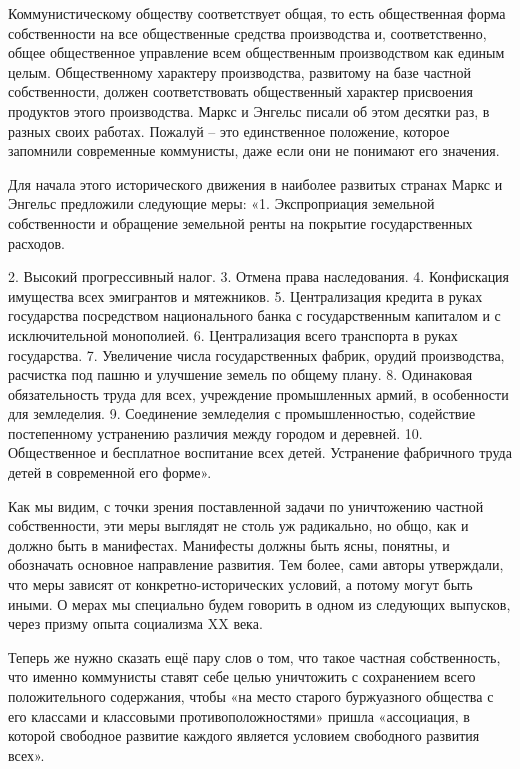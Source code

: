 \documentclass[../main]{subfiles}
\begin{document}
Коммунистическому обществу соответствует общая, то есть общественная форма собственности на все общественные средства производства и, соответственно, общее общественное управление всем общественным производством как единым целым. Общественному характеру производства, развитому на базе частной собственности, должен соответствовать общественный характер присвоения продуктов этого производства. Маркс и Энгельс писали об этом десятки раз, в разных своих работах. Пожалуй – это единственное положение, которое запомнили современные коммунисты, даже если они не понимают его значения.

Для начала этого исторического движения в наиболее развитых странах Маркс и Энгельс предложили следующие меры: «1. Экспроприация земельной собственности и обращение земельной ренты на покрытие государственных расходов.

2. Высокий прогрессивный налог. 3. Отмена права наследования. 4. Конфискация имущества всех эмигрантов и мятежников. 5. Централизация кредита в руках государства посредством национального банка с государственным капиталом и с исключительной монополией. 6. Централизация всего транспорта в руках государства. 7. Увеличение числа государственных фабрик, орудий производства, расчистка под пашню и улучшение земель по общему плану. 8. Одинаковая обязательность труда для всех, учреждение промышленных армий, в особенности для земледелия. 9. Соединение земледелия с промышленностью, содействие постепенному устранению различия между городом и деревней. 10. Общественное и бесплатное воспитание всех детей. Устранение фабричного труда детей в современной его форме».

Как мы видим, с точки зрения поставленной задачи по уничтожению частной собственности, эти меры выглядят не столь уж радикально, но общо, как и должно быть в манифестах. Манифесты должны быть ясны, понятны, и обозначать основное направление развития. Тем более, сами авторы утверждали, что меры зависят от конкретно-исторических условий, а потому могут быть иными. О мерах мы специально будем говорить в одном из следующих выпусков, через призму опыта социализма XX века.

Теперь же нужно сказать ещё пару слов о том, что такое частная собственность, что именно коммунисты ставят себе целью уничтожить с сохранением всего положительного содержания, чтобы «на место старого буржуазного общества с его классами и классовыми противоположностями» пришла «ассоциация, в которой свободное развитие каждого является условием свободного развития всех».
\end{document}
